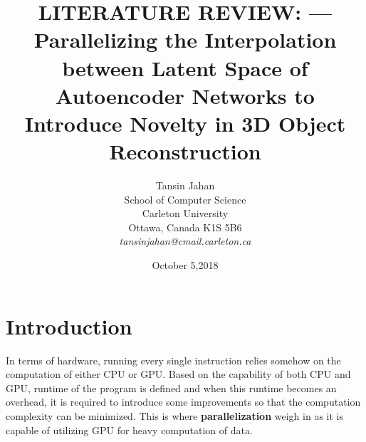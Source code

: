 \documentclass[11pt]{article}       %
\begin{document}


\title{LITERATURE REVIEW: --- Parallelizing the Interpolation between Latent Space of Autoencoder Networks to Introduce Novelty in 3D Object Reconstruction}


\author{
Tansin Jahan\\
School of Computer Science\\
Carleton University\\
Ottawa, Canada K1S 5B6\\
{\em tansinjahan@cmail.carleton.ca}
} %
\date{October 5,2018}
\maketitle



\section{Introduction} \label{intro}

In terms of hardware, running every single instruction relies somehow on the computation of either CPU or GPU. Based on the capability of both CPU and GPU, runtime of the program is defined and when this runtime becomes an overhead, it is required to introduce some improvements so that the computation complexity can be minimized. This is where \textbf{parallelization} weigh in as it is capable of utilizing GPU for heavy computation of data.   
\end{document}
